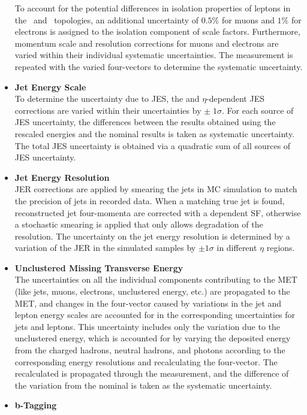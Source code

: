 \begin{itemize}
    To account for the potential differences in isolation properties of leptons in the \ttbar\ and \zjets\ topologies, an additional uncertainty of $0.5\%$ for muons and $1\%$ for electrons is assigned to the isolation component of scale factors.
    Furthermore, momentum scale and resolution corrections for muons and electrons are varied within their individual systematic uncertainties. 
    The measurement is repeated with the varied four-vectors to determine the systematic uncertainty.
    \item {\bf Jet Energy Scale} \\
    To determine the uncertainty due to JES, the \pT and $\eta$-dependent JES corrections are varied within their uncertainties by $\pm \; 1 \sigma$. 
    For each source of JES uncertainty, the differences between the results obtained using the rescaled energies and the nominal results is taken as systematic uncertainty. 
    The total JES uncertainty is obtained via a quadratic sum of all sources of JES uncertainty.
    \item {\bf Jet Energy Resolution} \\
    JER corrections are applied by smearing the jets in MC simulation to match the precision of jets in recorded data.
    When a matching true jet is found, reconstructed jet four-momenta are corrected with a \pT dependent SF, otherwise a stochastic smearing is applied that only allows degradation of the resolution.
    The uncertainty on the jet energy resolution is determined by a variation of the JER in the simulated samples by $\pm 1\sigma$ in different $\eta$ regions.
    \item {\bf Unclustered Missing Transverse Energy} \\
    The uncertainties on all the individual components contributing to the MET (like jets, muons, electrons, unclustered energy, etc.) are propagated to the MET, and changes in the \ETmiss four-vector caused by variations in the jet and lepton energy scales are accounted for in the corresponding uncertainties for jets and leptons.
    This uncertainty includes only the variation due to the unclustered energy, which is accounted for by varying the deposited energy from the charged hadrons, neutral hadrons, and photons according to the corresponding energy resolutions and recalculating the \ETmiss four-vector. 
    The recalculated \ETmiss is propagated through the measurement, and the difference of the variation from the nominal is taken as the systematic uncertainty.
    \item {\bf b-Tagging} \\

\end{itemize}
